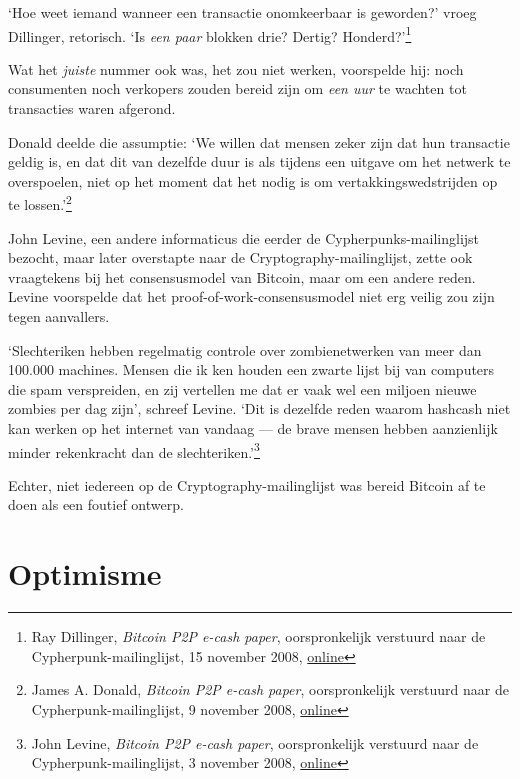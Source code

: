 \documentclass[
  a5paper,
  smalldemyvopaper,11pt,twoside,onecolumn,openright,extrafontsizes,
hidelinks]{memoir}
\begin{document}
`Hoe weet iemand wanneer een transactie onomkeerbaar is geworden?' vroeg
Dillinger, retorisch. `Is \emph{een paar} blokken drie? Dertig?
Honderd?'\footnote{Ray Dillinger, \emph{Bitcoin P2P e-cash paper},
  oorspronkelijk verstuurd naar de Cypherpunk-mailinglijst, 15 november
  2008,
  \href{https://www.metzdowd.com/pipermail/cryptography/2008-November/014859.html}{online}}

Wat het \emph{juiste} nummer ook was, het zou niet werken, voorspelde
hij: noch consumenten noch verkopers zouden bereid zijn om \emph{een
uur} te wachten tot transacties waren afgerond.

Donald deelde die assumptie: `We willen dat mensen zeker zijn dat hun
transactie geldig is, en dat dit van dezelfde duur is als tijdens een
uitgave om het netwerk te overspoelen, niet op het moment dat het nodig
is om vertakkingswedstrijden op te lossen.'\footnote{James A. Donald,
  \emph{Bitcoin P2P e-cash paper}, oorspronkelijk verstuurd naar de
  Cypherpunk-mailinglijst, 9 november 2008,
  \href{https://www.metzdowd.com/pipermail/cryptography/2008-November/014841.html}{online}}

John Levine, een andere informaticus die eerder de
Cypherpunks-mailinglijst bezocht, maar later overstapte naar de
Cryptography-mailinglijst, zette ook vraagtekens bij het consensusmodel
van Bitcoin, maar om een andere reden. Levine voorspelde dat het
proof-of-work-consensusmodel niet erg veilig zou zijn tegen aanvallers.

`Slechteriken hebben regelmatig controle over zombienetwerken van meer
dan 100.000 machines. Mensen die ik ken houden een zwarte lijst bij van
computers die spam verspreiden, en zij vertellen me dat er vaak wel een
miljoen nieuwe zombies per dag zijn', schreef Levine. `Dit is dezelfde
reden waarom hashcash niet kan werken op het internet van vandaag --- de
brave mensen hebben aanzienlijk minder rekenkracht dan de
slechteriken.'\footnote{John Levine, \emph{Bitcoin P2P e-cash paper},
  oorspronkelijk verstuurd naar de Cypherpunk-mailinglijst, 3 november
  2008,
  \href{https://www.metzdowd.com/pipermail/cryptography/2008-November/014817.html}{online}}

Echter, niet iedereen op de Cryptography-mailinglijst was bereid Bitcoin
af te doen als een foutief ontwerp.

\section{Optimisme}\label{optimisme}
\end{document}
